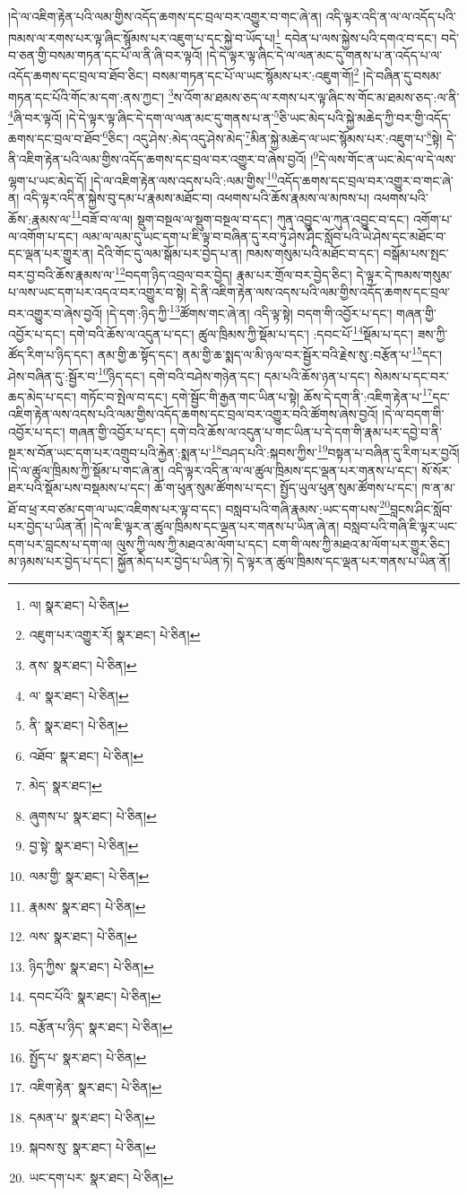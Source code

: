 །དེ་ལ་འཇིག་རྟེན་པའི་ལམ་གྱིས་འདོད་ཆགས་དང་བྲལ་བར་འགྱུར་བ་གང་ཞེ་ན། འདི་ལྟར་འདི་ན་ལ་ལ་འདོད་པའི་ཁམས་ལ་རགས་པར་ལྟ་ཞིང་སྙོམས་པར་འཇུག་པ་དང་སྐྱེ་བ་ཡོད་པ།\footnote{ལ།  སྣར་ཐང་།  པེ་ཅིན། } དབེན་པ་ལས་སྐྱེས་པའི་དགའ་བ་དང་། བདེ་བ་ཅན་གྱི་བསམ་གཏན་དང་པོ་ལ་ནི་ཞི་བར་ལྟའོ། །དེ་དེ་ལྟར་ལྟ་ཞིང་དེ་ལ་ལན་མང་དུ་གནས་པ་ན་འདོད་པ་ལ་འདོད་ཆགས་དང་བྲལ་བ་ཐོབ་ཅིང་། བསམ་གཏན་དང་པོ་ལ་ཡང་སྙོམས་པར་:འཇུག་གོ།\footnote{འཇུག་པར་འགྱུར་རོ།  སྣར་ཐང་།  པེ་ཅིན། } །དེ་བཞིན་དུ་བསམ་གཏན་དང་པོའི་གོང་མ་དག་:ནས་ཀྱང་། \footnote{ནས་  སྣར་ཐང་།  པེ་ཅིན། }ས་འོག་མ་ཐམས་ཅད་ལ་རགས་པར་ལྟ་ཞིང་ས་གོང་མ་ཐམས་ཅད་:ལ་ནི་\footnote{ལ་  སྣར་ཐང་།  པེ་ཅིན། }ཞི་བར་ལྟའོ། །དེ་དེ་ལྟར་ལྟ་ཞིང་དེ་དག་ལ་ལན་མང་དུ་གནས་པ་ན་\footnote{ནི་  སྣར་ཐང་།  པེ་ཅིན། }ཅི་ཡང་མེད་པའི་སྐྱེ་མཆེད་ཀྱི་བར་གྱི་འདོད་ཆགས་དང་བྲལ་བ་ཐོབ་\footnote{འཐོབ་  སྣར་ཐང་།  པེ་ཅིན། }ཅིང་། འདུ་ཤེས་:མེད་འདུ་ཤེས་མེད་\footnote{མེད་  སྣར་ཐང་། }མིན་སྐྱེ་མཆེད་ལ་ཡང་སྙོམས་པར་:འཇུག་པ་\footnote{ཞུགས་པ་  སྣར་ཐང་།  པེ་ཅིན། }སྟེ། དེ་ནི་འཇིག་རྟེན་པའི་ལམ་གྱིས་འདོད་ཆགས་དང་བྲལ་བར་འགྱུར་བ་ཞེས་བྱའོ། །\footnote{བྱ་སྟེ་  སྣར་ཐང་།  པེ་ཅིན། }དེ་ལས་གོང་ན་ཡང་མེད་ལ་དེ་ལས་ལྷག་པ་ཡང་མེད་དོ། །དེ་ལ་འཇིག་རྟེན་ལས་འདས་པའི་:ལམ་གྱིས་\footnote{ལམ་གྱི་  སྣར་ཐང་།  པེ་ཅིན། }འདོད་ཆགས་དང་བྲལ་བར་འགྱུར་བ་གང་ཞེ་ན། འདི་ལྟར་འདི་ན་སྐྱེས་བུ་དམ་པ་རྣམས་མཐོང་བ། འཕགས་པའི་ཆོས་རྣམས་ལ་མཁས་པ། འཕགས་པའི་ཆོས་:རྣམས་ལ་\footnote{རྣམས་  སྣར་ཐང་།  པེ་ཅིན། }བཟོ་བ་ལ་ལ། སྡུག་བསྔལ་ལ་སྡུག་བསྔལ་བ་དང་། ཀུན་འབྱུང་ལ་ཀུན་འབྱུང་བ་དང་། འགོག་པ་ལ་འགོག་པ་དང་། ལམ་ལ་ལམ་དུ་ཡང་དག་པ་ཇི་ལྟ་བ་བཞིན་དུ་རབ་ཏུ་ཤེས་ཤིང་སློབ་པའི་ཡེ་ཤེས་དང་མཐོང་བ་དང་ལྡན་པར་གྱུར་ན། དེའི་གོང་དུ་ལམ་སྒོམ་པར་བྱེད་པ་ན། ཁམས་གསུམ་པའི་མཐོང་བ་དང་། བསྒོམ་པས་སྤང་བར་བྱ་བའི་ཆོས་རྣམས་ལ་\footnote{ལས་  སྣར་ཐང་།  པེ་ཅིན། }བདག་ཉིད་འབྲལ་བར་བྱེད། རྣམ་པར་གྲོལ་བར་བྱེད་ཅིང་། དེ་ལྟར་དེ་ཁམས་གསུམ་པ་ལས་ཡང་དག་པར་འདའ་བར་འགྱུར་བ་སྟེ། དེ་ནི་འཇིག་རྟེན་ལས་འདས་པའི་ལམ་གྱིས་འདོད་ཆགས་དང་བྲལ་བར་འགྱུར་བ་ཞེས་བྱའོ། །དེ་དག་:ཉིད་ཀྱི་\footnote{ཉིད་ཀྱིས་  སྣར་ཐང་།  པེ་ཅིན། }ཚོགས་གང་ཞེ་ན། འདི་ལྟ་སྟེ། བདག་གི་འབྱོར་པ་དང་། གཞན་གྱི་འབྱོར་པ་དང་། དགེ་བའི་ཆོས་ལ་འདུན་པ་དང་། ཚུལ་ཁྲིམས་ཀྱི་སྡོམ་པ་དང་། :དབང་པོ་\footnote{དབང་པོའི་  སྣར་ཐང་།  པེ་ཅིན། }སྡོམ་པ་དང་། ཟས་ཀྱི་ཚོད་རིག་པ་ཉིད་དང་། ནམ་གྱི་ཆ་སྟོད་དང་། ནམ་གྱི་ཆ་སྨད་ལ་མི་ཉལ་བར་སྦྱོར་བའི་རྗེས་སུ་:བརྩོན་པ་\footnote{བརྩོན་པ་ཉིད་  སྣར་ཐང་།  པེ་ཅིན། }དང་། ཤེས་བཞིན་དུ་:སྦྱོར་བ་\footnote{སྤྱོད་པ་  སྣར་ཐང་།  པེ་ཅིན། }ཉིད་དང་། དགེ་བའི་བཤེས་གཉེན་དང་། དམ་པའི་ཆོས་ཉན་པ་དང་། སེམས་པ་དང་བར་ཆད་མེད་པ་དང་། གཏོང་བ་སྤེལ་བ་དང་། དགེ་སྦྱོང་གི་རྒྱན་གང་ཡིན་པ་སྟེ། ཆོས་དེ་དག་ནི་:འཇིག་རྟེན་པ་\footnote{འཇིག་རྟེན་  སྣར་ཐང་།  པེ་ཅིན། }དང་འཇིག་རྟེན་ལས་འདས་པའི་ལམ་གྱིས་འདོད་ཆགས་དང་བྲལ་བར་འགྱུར་བའི་ཚོགས་ཞེས་བྱའོ། །དེ་ལ་བདག་གི་འབྱོར་པ་དང་། གཞན་གྱི་འབྱོར་པ་དང་། དགེ་བའི་ཆོས་ལ་འདུན་པ་གང་ཡིན་པ་དེ་དག་གི་རྣམ་པར་དབྱེ་བ་ནི་སྔར་ས་བོན་ཡང་དག་པར་འགྲུབ་པའི་རྐྱེན་:སྨན་པ་\footnote{དམན་པ་  སྣར་ཐང་།  པེ་ཅིན། }བཤད་པའི་:སྐབས་ཀྱིས་\footnote{སྐབས་སུ་  སྣར་ཐང་།  པེ་ཅིན། }བསྟན་པ་བཞིན་དུ་རིག་པར་བྱའོ། །དེ་ལ་ཚུལ་ཁྲིམས་ཀྱི་སྡོམ་པ་གང་ཞེ་ན། འདི་ལྟར་འདི་ན་ལ་ལ་ཚུལ་ཁྲིམས་དང་ལྡན་པར་གནས་པ་དང་། སོ་སོར་ཐར་པའི་སྡོམ་པས་བསྡམས་པ་དང་། ཆོ་ག་ཕུན་སུམ་ཚོགས་པ་དང་། སྤྱོད་ཡུལ་ཕུན་སུམ་ཚོགས་པ་དང་། ཁ་ན་མ་ཐོ་བ་ཕྲ་རབ་ཙམ་དག་ལ་ཡང་འཇིགས་པར་ལྟ་བ་དང་། བསླབ་པའི་གཞི་རྣམས་:ཡང་དག་པས་\footnote{ཡང་དག་པར་  སྣར་ཐང་།  པེ་ཅིན། }བླངས་ཤིང་སློབ་པར་བྱེད་པ་ཡིན་ནོ། །དེ་ལ་ཇི་ལྟར་ན་ཚུལ་ཁྲིམས་དང་ལྡན་པར་གནས་པ་ཡིན་ཞེ་ན། བསླབ་པའི་གཞི་ཇི་ལྟར་ཡང་དག་པར་བླངས་པ་དག་ལ། ལུས་ཀྱི་ལས་ཀྱི་མཐའ་མ་ལོག་པ་དང་། ངག་གི་ལས་ཀྱི་མཐའ་མ་ལོག་པར་གྱུར་ཅིང་། མ་ཉམས་པར་བྱེད་པ་དང་། སྐྱོན་མེད་པར་བྱེད་པ་ཡིན་ཏེ། དེ་ལྟར་ན་ཚུལ་ཁྲིམས་དང་ལྡན་པར་གནས་པ་ཡིན་ནོ། 